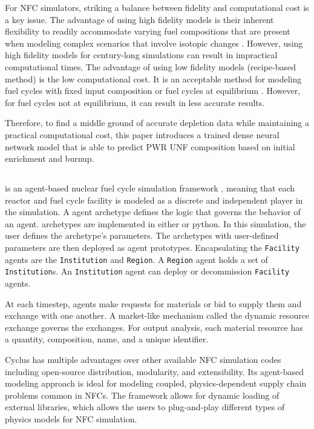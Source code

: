 For \gls{NFC} simulators, striking a balance between fidelity 
and computational cost is a key issue. 
The advantage of using high fidelity models is their inherent flexibility 
to readily accommodate varying fuel compositions that are present 
when modeling complex scenarios that involve isotopic changes
\cite{sunny_transition_2015}. 
However, using high fidelity models for century-long simulations 
can result in impractical computational times. 
The advantage of using low fidelity models (recipe-based method)
is the low computational cost. 
It is an acceptable method for modeling fuel cycles with fixed input 
composition or fuel cycles at equilibrium \cite{sunny_transition_2015}. 
However, for fuel cycles not at equilibrium, it can result in less 
accurate results. 

Therefore, to find a middle ground of accurate depletion data while 
maintaining a practical computational cost, this paper introduces 
a trained dense neural network model that is able to predict \gls{PWR} \gls{UNF}
composition based on initial enrichment and burnup. 

\subsection{\Cyclus}

\Cyclus is an agent-based nuclear fuel cycle simulation framework 
\cite{huff_fundamental_2016}, meaning
that each reactor and fuel cycle facility is modeled as a discrete and independent
player in the simulation.
A \Cyclus agent archetype defines the logic that governs the behavior
of an agent. 
\Cyclus archetypes are implemented in  either \CC  or python.
In this simulation, the user defines the archetype's
parameters. The archetypes with user-defined parameters are then deployed
as agent prototypes.  Encapsulating the \texttt{Facility} agents are the \texttt{Institution} and \texttt{Region}.
A \texttt{Region} agent holds a set of \texttt{Institution}s. 
An \texttt{Institution} agent can deploy or decommission \texttt{Facility} agents.

At each timestep,
agents make requests for materials or bid to supply them and exchange
with one another. A market-like mechanism called the dynamic resource exchange
\cite{gidden_methodology_2016} governs the exchanges.
For output analysis, each material resource has a quantity, composition, name, and a unique identifier.

Cyclus has multiple advantages over other available
\gls{NFC} simulation codes including open-source distribution, modularity,
and extensibility. Its agent-based modeling approach
is ideal for modeling coupled, physics-dependent
supply chain problems common in \glspl{NFC}.
The framework allows for dynamic loading of 
external libraries, which allows the users to plug-and-play
different types of physics models for \gls{NFC}
simulation.


